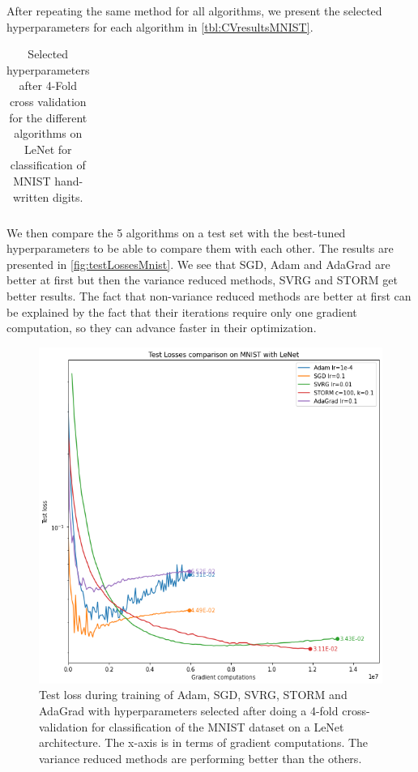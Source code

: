 \documentclass[a4paper,11pt,oneside]{report}
\begin{document}
After repeating the same method for all algorithms, we present the selected hyperparameters for each algorithm in \autoref{tbl:CVresultsMNIST}.

\begin{table}
    \begin{center}
        \begin{tabular}{||c | c | l||}
             \hline
             
        \end{tabular}
    \end{center}
    \caption{Selected hyperparameters after 4-Fold cross validation for the different algorithms on LeNet for classification of MNIST hand-written digits.
    }
    \label{tbl:CVresultsMNIST}
\end{table}

We then compare the 5 algorithms on a test set with the best-tuned hyperparameters to be able to compare them with each other. The results are presented in \autoref{fig:testLossesMnist}. We see that SGD, Adam and AdaGrad are better at first but then the variance reduced methods, SVRG and STORM get better results. The fact that non-variance reduced methods are better at first can be explained by the fact that their iterations require only one gradient computation, so they can advance faster in their optimization.

\begin{figure}
    \centering
    \includegraphics[width=.8\columnwidth]{midterm presentation/images/testLossesMnist.png}
    \caption{Test loss during training of Adam, SGD, SVRG, STORM and AdaGrad with hyperparameters selected after doing a 4-fold cross-validation for classification of the MNIST dataset on a LeNet architecture. The x-axis is in terms of gradient computations. The variance reduced methods are performing better than the others.}
    \label{fig:testLossesMnist}
\end{figure}
\end{document}
